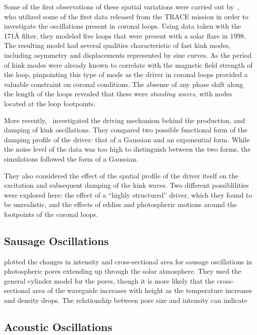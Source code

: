 \documentclass[preprint2]{aastex}
\begin{document}
Some of the first observations of these spatial variations
were carried out by~\cite{kink_1},
who utilized some of the first data released from the TRACE mission in
order to investigate the oscillations present in coronal loops.
Using data taken with the 171\AA{} filter, they modeled five loops that
were present with a solar flare in 1998.
The resulting model had several qualities characteristic of
fast kink modes, including asymmetry
and
displacements represented by sine curves.
As the period of kink modes were already known to correlate
with the magnetic field strength of the loop, pinpointing this
type of mode as the driver in coronal loops provided a valuable
constraint on coronal conditions.
The absense of any phase
shift along the length of the loops revealed that these were
\emph{standing waves}, with nodes located at the loop footpoints.

More recently,~\cite{kink_2} investigated the driving mechanism
behind the production, and damping of kink oscillations.
They compared two possible functional form of the damping profile
of the driver: that of a Gaussian and an exponential form.
While the noise level of the data was too high to distinguish
between the two forms, the simulations followed the form of a
Gaussian.

They also considered the effect of the spatial profile of the driver
itself on the excitation and subsequent damping of the kink
waves. Two different possiblilities were explored here:
the effect of a ``highly structured'' driver, which they
found to be unrealistic, and the effects of eddies and photospheric
motions around the footpoints of the coronal loops.



\subsection{Sausage Oscillations}
\cite{sausage_1} plotted the changes in intensity and cross-sectional
area for sausage oscillations in photospheric pores extending up
through the solar atmosphere. They used the general cylinder model for
the pores, though it is more likely that the cross-sectional area of
the waveguide increases with height as the temperature increases and
density drops. The relationship between pore size and intensity can
indicate

\subsection{Acoustic Oscillations}
\end{document}
